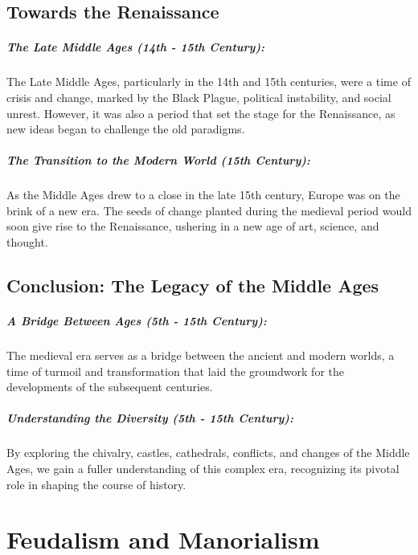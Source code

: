 \documentclass[a4paper,12pt]{book}
\begin{document}
\section*{Towards the Renaissance}

\paragraph{The Late Middle Ages (14th - 15th Century):}
The Late Middle Ages, particularly in the 14th and 15th centuries, were a time of crisis and change, marked by the Black Plague, political instability, and social unrest. However, it was also a period that set the stage for the Renaissance, as new ideas began to challenge the old paradigms.

\paragraph{The Transition to the Modern World (15th Century):}
As the Middle Ages drew to a close in the late 15th century, Europe was on the brink of a new era. The seeds of change planted during the medieval period would soon give rise to the Renaissance, ushering in a new age of art, science, and thought.

\section*{Conclusion: The Legacy of the Middle Ages}

\paragraph{A Bridge Between Ages (5th - 15th Century):}
The medieval era serves as a bridge between the ancient and modern worlds, a time of turmoil and transformation that laid the groundwork for the developments of the subsequent centuries.

\paragraph{Understanding the Diversity (5th - 15th Century):}
By exploring the chivalry, castles, cathedrals, conflicts, and changes of the Middle Ages, we gain a fuller understanding of this complex era, recognizing its pivotal role in shaping the course of history.

\chapter{Feudalism and Manorialism}
\end{document}
